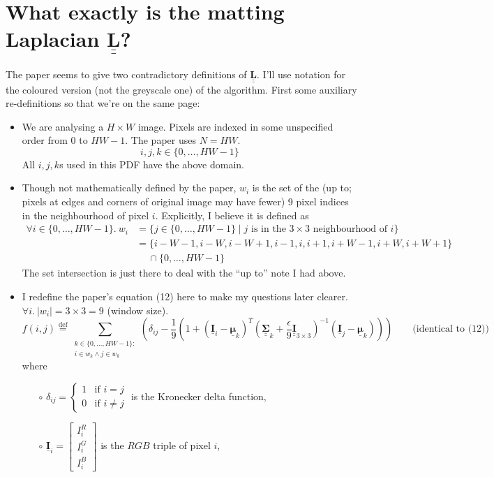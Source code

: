 \documentclass{article}
\def\vec#1{\underline{\mathbf{#1}}}
\def\vecbs#1{\underline{\boldsymbol{#1}}}
\def\mat#1{\underline{\underline{\mathbf{#1}}}}
\def\matbs#1{\underline{\underline{\boldsymbol{#1}}}}
\begin{document}
\section{What exactly is the matting Laplacian $\mat{L}$?}
The paper seems to give two contradictory definitions of $\mat{L}$. I'll use notation for the coloured version (not the greyscale one) of the algorithm. First some auxiliary re-definitions so that we're on the same page:
\begin{itemize}
    \item We are analysing a $H\times W$ image. Pixels are indexed in some unspecified order from $0$ to $HW-1$. The paper uses $N=HW$.
    $$i,j,k \in \{0,\dots,HW-1\}$$
    All $i,j,k$s used in this PDF have the above domain.
    \item Though not mathematically defined by the paper, $w_i$ is the set of the (up to; pixels at edges and corners of original image may have fewer) 9 pixel indices in the neighbourhood of pixel $i$. Explicitly, I believe it is defined as
    \begin{align*}
        \forall i\in\{0,\dots,HW-1\}.\ w_i &= \{j \in \{0,\dots,HW-1\} \mid j\text{ is in the $3\times 3$ neighbourhood of }i\}\\
        &= \{i-W-1, i-W, i-W+1, i-1, i, i+1, i+W-1, i+W, i+W+1\} \\
        &\quad\ \cap \{0,\dots,HW-1\}
    \end{align*}
    The set intersection is just there to deal with the ``up to'' note I had above.
    \item I redefine the paper's equation (12) here to make my questions later clearer. $\forall i.\ |w_i|=3\times 3=9$ (window size).
    $$f(i,j) \overset{\text{def}}= \sum_{\substack{k\in\{0,\dots,HW-1\}:\\i\in w_k\wedge j\in w_k}} \left(\delta_{ij} - \frac19\left(1 + \left(\vec{I}_i - \vecbs\mu_k\right)^T \left(\matbs\Sigma_k + \frac\epsilon9 \mat{I}_{3\times 3}\right)^{-1} \left(\vec{I}_j - \vecbs\mu_k\right) \right)\right)\qquad\text{(identical to (12))}$$
    where
    \begin{itemize}
        \item[$\circ$] $\delta_{ij}=\begin{cases}1&\text{if $i=j$}\\0&\text{if $i\neq j$}\end{cases}$ is the Kronecker delta function,
        \item[$\circ$] $\vec{I}_i=\begin{bmatrix}I_i^R\\I_i^G\\I_i^B\end{bmatrix}$ is the $RGB$ triple of pixel $i$,

\end{itemize}
\end{itemize}
\end{document}
